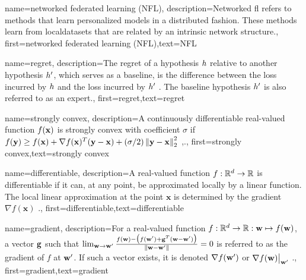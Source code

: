 {name={networked federated learning (NFL)},
	description={Networked \gls{fl} refers 
		to methods that learn personalized \gls{model}s in a distributed fashion. These methods learn from \gls{localdataset}s 
		that are related by an intrinsic network structure.},
 first={networked federated learning (NFL)},text={NFL} 
}




{name={regret},
	description={The regret of a \gls{hypothesis} $h$ relative to 
		another \gls{hypothesis} $h'$, which serves as a \gls{baseline}, 
		is the difference between the \gls{loss} incurred by $h$ and the \gls{loss} 
		incurred by $h'$ \cite{PredictionLearningGames}. 
		The \gls{baseline} \gls{hypothesis} $h'$ is also referred to as an \gls{expert}.},
	first={regret},text={regret} 
}

{name={strongly convex},
	description={A continuously \gls{differentiable} real-valued 
		function $f({\bf x})$ is strongly \gls{convex} with coefficient $\sigma$ if $f({\bf y}) \geq f({\bf x}) + \nabla f({\bf x})^{T} ({\bf y} - {\bf x}) + (\sigma/2) \left\Vert {{\bf y}- {\bf x}} \right\Vert_{2}^{2}$ \cite{nesterov04},\cite[Sec. B.1.1]{CvxAlgBertsekas}.},
	first={strongly convex},text={strongly convex} 
}

{name={differentiable},
	description={A real-valued function $f: \mathbb{R}^{d} \rightarrow \mathbb{R}$ 
		is differentiable if it can, at any point, be approximated locally by a linear 
		function. The local linear approximation at the point $\mathbf{x}$ is determined 
		by the \gls{gradient} $\nabla f ( \mathbf{x})$ \cite{RudinBookPrinciplesMatheAnalysis}.},
	first={differentiable},text={differentiable} 
}

{name={gradient},
	description={For a real-valued function $f: \mathbb{R}^{d} \rightarrow \mathbb{R}: {\bf w} \mapsto f({\bf w})$, 
	a vector ${\bf g}$ such that $\lim_{{\bf w} \rightarrow {\bf w}'} \frac{f({\bf w}) - \big(f({\bf w}')+ {\bf g}^{T} ({\bf w}- {\bf w}') \big) }{\| {\bf w}-{\bf w}'\|}=0$ 
	is referred to as the gradient of $f$ at ${\bf w}'$. If such a vector exists, it is 
	denoted $\nabla f({\bf w}')$ or $\nabla f({\bf w})\big|_{{\bf w}'}$ \cite{RudinBookPrinciplesMatheAnalysis}.},
	first={gradient},text={gradient} 
}

